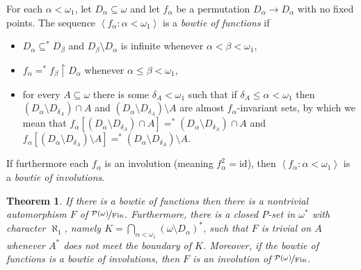 \documentclass[11pt,leqno]{amsart}
\newtheorem{theorem}{Theorem}[section]
\newtheorem{lemma}[theorem]{Lemma}
\theoremstyle{definition}
\theoremstyle{remark}
\newcommand{\explicitSet}[1]{\left\lbrace #1 \right\rbrace}
\newcommand{\brackets}[1]{\left\langle #1 \right\rangle}
\newcommand{\set}[2]{\explicitSet{#1 \colon #2}}
\newcommand{\seq}[2]{\brackets{#1 \colon #2}}
\newcommand{\<}{\langle}
\renewcommand{\>}{\rangle}
\renewcommand{\a}{\alpha}
\renewcommand{\b}{\beta}
\newcommand{\dlt}{\delta}
\newcommand{\w}{\omega}
\newcommand{\0}{\emptyset}
\newcommand{\sub}{\subseteq}
\newcommand{\rest}{\!\restriction\!}
\newcommand{\1}{1\hspace{-1.75mm}1}
\newcommand{\pwmf}{\nicefrac{\mathcal{P}(\w)}{\mathrm{Fin}}}
\begin{document}
For each $\a < \w_1$, let $D_\a \sub \w$ and let $f_\a$ be a permutation $D_\a \to D_\a$ with no fixed points. 
The sequence $\seq{f_\a}{\a < \w_1}$ is a \emph{bowtie of functions} if 
\begin{itemize}
\item[$\circ$] $D_\a \sub^* D_\b$ and $D_\b \setminus D_\a$ is infinite whenever $\a < \b < \w_1$, 
\item[$\circ$] $f_\a =^* f_\b \rest D_\a$ whenever $\a \leq \b < \w_1$, 
\item[$\circ$] for every $A \sub \w$ there is some $\dlt_A < \w_1$ such that if $\dlt_A \leq \a < \w_1$ then $( D_\a \setminus D_{\dlt_A} ) \cap A$ and 
$( D_\a \setminus D_{\dlt_A} ) \setminus A$ 
are almost $f_\a$-invariant sets, by which we mean that 
$f_\a[ ( D_\a \setminus D_{\dlt_A} ) \cap A ] =^* ( D_\a \setminus D_{\dlt_A} ) \cap A$ 
and 
$f_\a[ ( D_\a \setminus D_{\dlt_A} ) \setminus A ] =^* ( D_\a \setminus D_{\dlt_A} ) \setminus A$.
\end{itemize}
If furthermore each $f_\a$ is an involution (meaning $f_\a^2 = \mathrm{id}$), then $\seq{f_\a}{\a < \w_1}$ is a \emph{bowtie of involutions}. 

\begin{theorem}\label{thm:bowties}
If there is a bowtie of functions then there is a nontrivial automorphism $F$ of $\pwmf$. 
Furthermore, there is a closed $P$-set in $\w^*$ with character $\aleph_1$, namely $K = \bigcap_{\a < \w_1}(\w \setminus D_\a)^*$, such that $F$ is trivial on $A$ whenever $A^*$ does not meet the boundary of $K$. 
Moreover, if the bowtie of functions is a bowtie of involutions, then $F$ is an involution of $\pwmf$.
\end{theorem}

%
%
\end{document}
